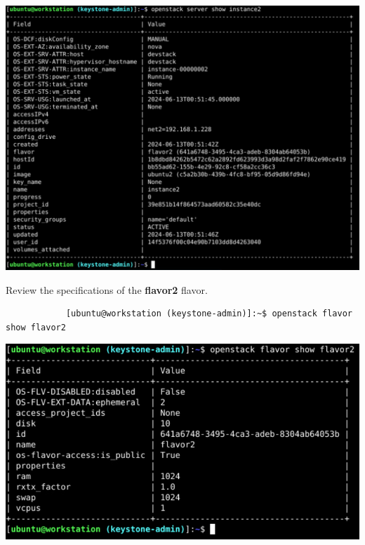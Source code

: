 \documentclass[letterpaper, 12pt]{article}
\begin{document}
\begin{enumerate}
\begin{labstep}
        \begin{center}
            \includegraphics[scale=0.43]{images/part5/step3.png}
        \end{center}
    \end{labstep}

    \begin{labstep}
        Review the specifications of the \textbf{flavor2} flavor.
        \begin{lstlisting}
            [ubuntu@workstation (keystone-admin)]:~$ openstack flavor show flavor2
        \end{lstlisting}

        \begin{center}
            \includegraphics[width=\linewidth]{images/part5/step4.png}
        \end{center}
    \end{labstep}


\end{enumerate}
\end{document}
